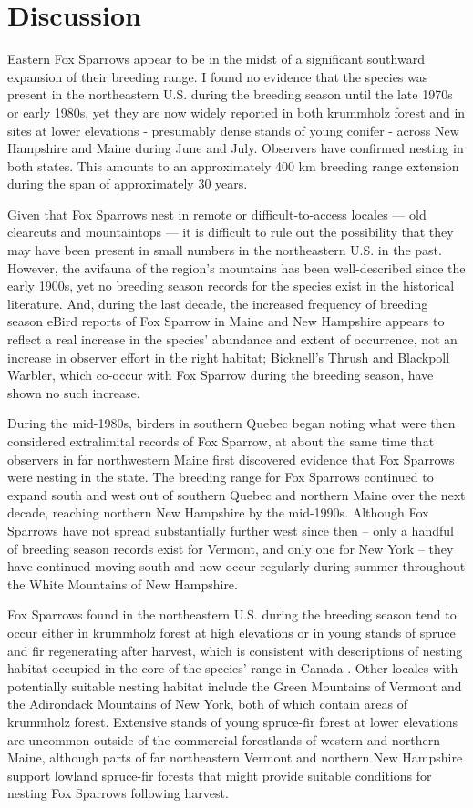 \documentclass[fleqn,10pt,lineno]{wlpeerj} %
\begin{document}
\section*{Discussion}
Eastern Fox Sparrows appear to be in the midst of a significant southward expansion of their breeding range. I found no evidence that the species was present in the northeastern U.S. during the breeding season until the late 1970s or early 1980s, yet they are now widely reported in both krummholz forest and in sites at lower elevations - presumably dense stands of young conifer - across New Hampshire and Maine during June and July. Observers have confirmed nesting in both states. This amounts to an approximately 400 km breeding range extension during the span of approximately 30 years. 

Given that Fox Sparrows nest in remote or difficult-to-access locales — old clearcuts and mountaintops — it is difficult to rule out the possibility that they may have been present in small numbers in the northeastern U.S. in the past. However, the avifauna of the region’s mountains has been well-described since the early 1900s, yet no breeding season records for the species exist in the historical literature. And, during the last decade, the increased frequency of breeding season eBird reports of Fox Sparrow in Maine and New Hampshire appears to reflect a real increase in the species’ abundance and extent of occurrence, not an increase in observer effort in the right habitat; Bicknell’s Thrush and Blackpoll Warbler, which co-occur with Fox Sparrow during the breeding season, have shown no such increase. 

During the mid-1980s, birders in southern Quebec began noting what were then considered extralimital records of Fox Sparrow, at about the same time that observers in far northwestern Maine first discovered evidence that Fox Sparrows were nesting in the state. The breeding range for Fox Sparrows continued to expand south and west out of southern Quebec and northern Maine over the next decade, reaching northern New Hampshire by the mid-1990s. Although Fox Sparrows have not spread substantially further west since then – only a handful of breeding season records exist for Vermont, and only one for New York – they have continued moving south and now occur regularly during summer throughout the White Mountains of New Hampshire.

Fox Sparrows found in the northeastern U.S. during the breeding season tend to occur either in krummholz forest at high elevations or in young stands of spruce and fir regenerating after harvest, which is consistent with descriptions of nesting habitat occupied in the core of the species’ range in Canada \citep{Weckstein2002-px}. Other locales with potentially suitable nesting habitat include the Green Mountains of Vermont and the Adirondack Mountains of New York, both of which contain areas of krummholz forest. Extensive stands of young spruce-fir forest at lower elevations are uncommon outside of the commercial forestlands of western and northern Maine, although parts of far northeastern Vermont and northern New Hampshire support lowland spruce-fir forests that might provide suitable conditions for nesting Fox Sparrows following harvest.
\end{document}
